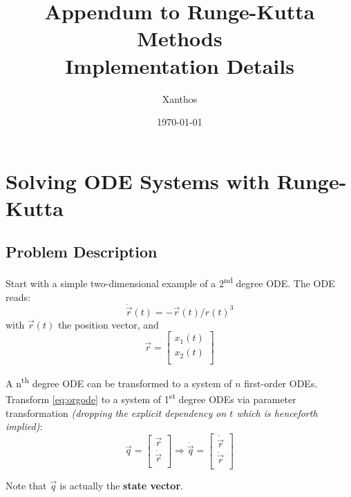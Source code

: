 \documentclass[12pt,a4paper,twoside]{report}
\title{Appendum to Runge-Kutta Methods\\Implementation Details}
\author{Xanthos}
\date{\today}
\begin{document}
\begin{titlepage}
\maketitle
\end{titlepage}


\section{Solving ODE Systems with Runge-Kutta}

\subsection{Problem Description}
\label{ssec:problem-description}
Start with a simple two-dimensional example of a 2\textsuperscript{nd} degree ODE.
The ODE reads:
\begin{equation}
  \label{eq:orgode}
  \ddot{\vec{r}}(t) = - \vec{r}(t) / {r(t)}^3
\end{equation}
with \( \vec{r}(t) \) the position vector, and
\begin{equation}
  \vec{r} = 
  \begin{bmatrix}
  x_{1}(t) \\
  x_{2}(t) \\
  \end{bmatrix}
\end{equation}

A n\textsuperscript{th} degree ODE can be transformed to a system of \(n\) first-order ODEs.
Transform \ref{eq:orgode} to a system of 1\textsuperscript{st} degree ODEs via parameter transformation 
\textit{(dropping the explicit dependency on \(t\) which is henceforth implied)}:
\begin{equation}
  \vec{q} = 
  \begin{bmatrix}
    \vec{r} \\
    \dot{\vec{r}} \\
  \end{bmatrix}
\Rightarrow
  \dot{\vec{q}} = 
  \begin{bmatrix}
    \dot{\vec{r}} \\
    \ddot{\vec{r}} \\
  \end{bmatrix}
\end{equation}

Note that \( \vec{q} \) is actually the \textbf{state vector}.
\end{document}
